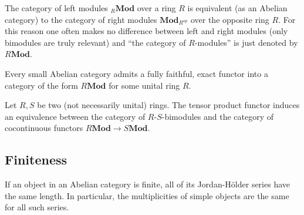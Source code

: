     \begin{notation}
        The category of left modules ${}_R\mathbf{Mod}$ over a ring $R$ is equivalent (as an Abelian category) to the category of right modules $\mathbf{Mod}_{R^{op}}$ over the opposite ring $R$. For this reason one often makes no difference between left and right modules (only bimodules are truly relevant) and ``the category of $R$-modules'' is just denoted by $R\mathbf{Mod}$.
    \end{notation}

    \begin{theorem}\label{cat:freyd_mitchell}
        Every small Abelian category admits a fully faithful, exact functor into a category of the form $R\mathbf{Mod}$ for some unital ring $R$.
    \end{theorem}

    \begin{theorem}
        Let $R,S$ be two (not necessarily unital) rings. The tensor product functor induces an equivalence between the category of $R\text{-}S$-bimodules and the category of cocontinuous functors $R\mathbf{Mod}\rightarrow S\mathbf{Mod}$.
    \end{theorem}

\subsection{Finiteness}


    \begin{theorem}
        If an object in an Abelian category is finite, all of its Jordan-H\"older series have the same length. In particular, the multiplicities of simple objects are the same for all such series.
    \end{theorem}

